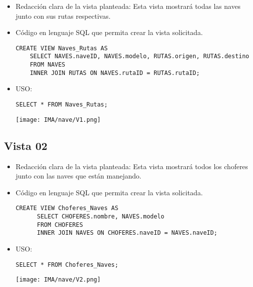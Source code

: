 \begin{itemize}
    \item Redacción clara de la vista planteada: Esta vista mostrará todas las naves junto con sus rutas respectivas.
    \item Código en lenguaje SQL que permita crear la vista solicitada.
    
    \begin{lstlisting}[caption={Tablas para la BdDatos}, label={lst:sql_estadios}]
    CREATE VIEW Naves_Rutas AS
    SELECT NAVES.naveID, NAVES.modelo, RUTAS.origen, RUTAS.destino
    FROM NAVES
    INNER JOIN RUTAS ON NAVES.rutaID = RUTAS.rutaID;
    \end{lstlisting}    
    
    \item USO:
    
    \begin{lstlisting}[caption={Tablas para la BdDatos}, label={lst:sql_estadios}]
    SELECT * FROM Naves_Rutas;
    \end{lstlisting}    

    \begin{center}
      \texttt{[image: IMA/nave/V1.png]}
    \end{center}
\end{itemize}


\subsection*{Vista 02}

\begin{itemize}
    \item Redacción clara de la vista planteada: Esta vista mostrará todos los choferes junto con las naves que están manejando.
    \item Código en lenguaje SQL que permita crear la vista solicitada.
    
    \begin{lstlisting}[caption={Tablas para la BdDatos}, label={lst:sql_estadios}]
      CREATE VIEW Choferes_Naves AS
      SELECT CHOFERES.nombre, NAVES.modelo
      FROM CHOFERES
      INNER JOIN NAVES ON CHOFERES.naveID = NAVES.naveID;      
    \end{lstlisting}    
    
    \item USO:
    
    \begin{lstlisting}[caption={Tablas para la BdDatos}, label={lst:sql_estadios}]
      SELECT * FROM Choferes_Naves;      
    \end{lstlisting}    

    \begin{center}
      \texttt{[image: IMA/nave/V2.png]}
    \end{center}
\end{itemize}


